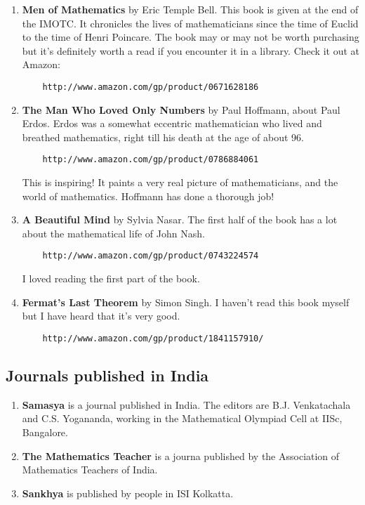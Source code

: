 \documentclass[a4paper]{amsart}
\begin{document}
\begin{enumerate}

\item {\bf Men of Mathematics} by Eric Temple Bell. This book is given at the end of the IMOTC. It chronicles the lives
  of mathematicians since the time of Euclid to the time of Henri Poincare. The book may or may not be worth
  purchasing but it's definitely worth a read if you encounter it in a library. Check it out at Amazon:

\begin{verbatim}
    http://www.amazon.com/gp/product/0671628186
\end{verbatim}

\item {\bf The Man Who Loved Only Numbers} by Paul Hoffmann, about Paul Erdos. Erdos was a somewhat eccentric mathematician who lived
  and breathed mathematics, right till his death at the age of about 96.
\begin{verbatim}
    http://www.amazon.com/gp/product/0786884061
\end{verbatim}

  This is inspiring! It paints a very real picture of mathematicians, and the world of mathematics. Hoffmann has done a thorough
  job!
\item {\bf A Beautiful Mind} by Sylvia Nasar. The first half of the book has a lot about the mathematical life of John Nash.
\begin{verbatim}
    http://www.amazon.com/gp/product/0743224574
\end{verbatim}

  I loved reading the first part of the book.
\item {\bf Fermat's Last Theorem} by Simon Singh. I haven't read this book myself but I have heard that it's very good.

\begin{verbatim}
    http://www.amazon.com/gp/product/1841157910/
\end{verbatim}

\end{enumerate}

\subsection{Journals published in India}

\begin{enumerate}

\item {\bf Samasya} is a journal published in India. The editors are B.J. Venkatachala and C.S. Yogananda, working in
  the Mathematical Olympiad Cell at IISc, Bangalore.

\item {\bf The Mathematics Teacher} is a journa published by the Association of Mathematics Teachers of India.

\item {\bf Sankhya} is published by people in ISI Kolkatta.
\end{enumerate}
\end{document}
